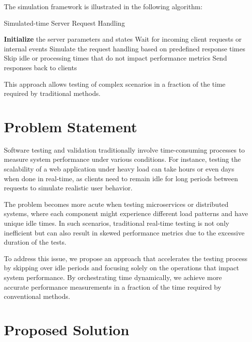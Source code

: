 The simulation framework is illustrated in the following algorithm:

\begin{algorithm}[H]
\caption{Simulated-time Server Request Handling} \label{alg:server_time_skipping}
\begin{algorithmic}[1]
    \STATE \textbf{Initialize} the server parameters and states
        \STATE Wait for incoming client requests or internal events
        \STATE Simulate the request handling based on predefined response times
        \STATE Skip idle or processing times that do not impact performance metrics
        \STATE Send responses back to clients
    \ENDWHILE
\end{algorithmic}
\end{algorithm}

This approach allows testing of complex scenarios in a fraction of the time required by traditional methods.

\section{Problem Statement}

Software testing and validation traditionally involve time-consuming processes to measure system performance under various conditions. For instance, testing the scalability of a web application under heavy load can take hours or even days when done in real-time, as clients need to remain idle for long periods between requests to simulate realistic user behavior.

The problem becomes more acute when testing microservices or distributed systems, where each component might experience different load patterns and have unique idle times. In such scenarios, traditional real-time testing is not only inefficient but can also result in skewed performance metrics due to the excessive duration of the tests.

To address this issue, we propose an approach that accelerates the testing process by skipping over idle periods and focusing solely on the operations that impact system performance. By orchestrating time dynamically, we achieve more accurate performance measurements in a fraction of the time required by conventional methods.

\section{Proposed Solution}

